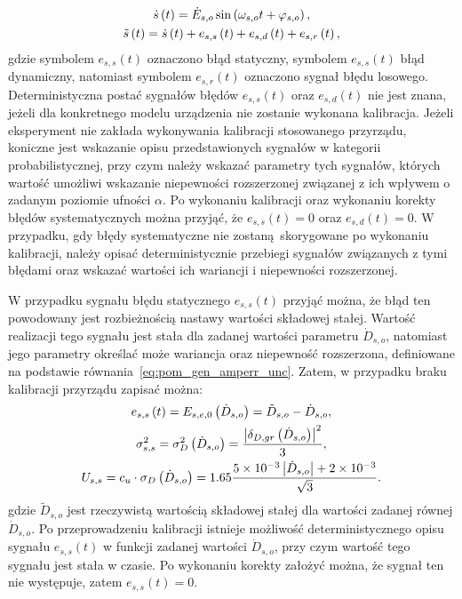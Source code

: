 \begin{gather}
\dot{s} \left(t\right) = \dot{E}_{s,o} \sin \left(\omega_{s,o} t + \varphi_{s,o}\right) \label{eq:pom_gen_out_ideal}, \\
\tilde{s} \left(t\right) = \dot{s} \left(t\right) + e_{s,s} \left(t\right) + e_{s,d} \left(t\right) + e_{s,r} \left(t\right)\label{eq:pom_gen_out_real},
\end{gather}
gdzie symbolem $e_{s,s}(t)$ oznaczono błąd statyczny, symbolem $e_{s,s}(t)$ błąd dynamiczny, natomiast symbolem $e_{s,r}(t)$ oznaczono sygnał błędu losowego. Deterministyczna postać sygnałów błędów $e_{s,s}(t)$ oraz $e_{s,d}(t)$ nie jest znana, jeżeli dla konkretnego modelu urządzenia nie zostanie wykonana kalibracja. Jeżeli eksperyment nie zakłada wykonywania kalibracji stosowanego przyrządu, koniczne jest wskazanie opisu przedstawionych sygnałów w kategorii probabilistycznej, przy czym należy wskazać parametry tych sygnałów, których wartość umożliwi wskazanie niepewności rozszerzonej związanej z ich wpływem o zadanym poziomie ufności $\alpha$. Po wykonaniu kalibracji oraz wykonaniu korekty błędów systematycznych można przyjąć, że $e_{s,s}(t) = 0$ oraz $e_{s,d}(t) = 0$. W przypadku, gdy błędy systematyczne nie zostaną skorygowane po wykonaniu kalibracji, należy opisać deterministycznie przebiegi sygnałów związanych z tymi błędami oraz wskazać wartości ich wariancji i niepewności rozszerzonej.

W przypadku sygnału błędu statycznego $e_{s,s}(t)$ przyjąć można, że błąd ten powodowany jest rozbieżnością nastawy wartości składowej stałej. Wartość realizacji tego sygnału jest stała dla zadanej wartości parametru $\dot{D}_{s,o}$, natomiast jego parametry określać może wariancja oraz niepewność rozszerzona, definiowane na podstawie równania~\eqref{eq:pom_gen_amperr_unc}. Zatem, w przypadku braku kalibracji przyrządu zapisać można:
\begin{gather}
e_{s,s} \left(t\right) = E_{s,e,0} \left(\dot{D}_{s,o}\right) = \tilde{D}_{s,o} - \dot{D}_{s,o} \label{eq:pom_gen_err_stat}, \\
\sigma_{s,s}^{2} = \sigma_{D}^{2} \left(\dot{D}_{s,o}\right) = \frac{\left| \delta_{D,gr} \left(\dot{D}_{s,o}\right) \right|^{2}}{3} \label{eq:pom_gen_var_stat}, \\
U_{s,s} = c_{u} \cdot \sigma_{D} \left(\dot{D}_{s,o}\right) = 1.65 \frac{\num{5e-3} \left| \dot{D}_{s,o} \right| + \num{2e-3}}{\sqrt{3}} \label{eq:pom_gen_unc_stat}.
\end{gather}
gdzie $\tilde{D}_{s,o}$ jest rzeczywistą wartością składowej stałej dla wartości zadanej równej $\dot{D}_{s,o}$. Po przeprowadzeniu kalibracji istnieje możliwość deterministycznego opisu sygnału $e_{s,s}(t)$ w funkcji zadanej wartości $\dot{D}_{s,o}$, przy czym wartość tego sygnału jest stała w czasie. Po wykonaniu korekty założyć można, że sygnał ten nie występuje, zatem $e_{s,s}(t) = 0$.

